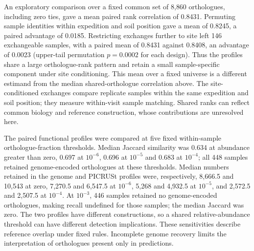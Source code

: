 \documentclass[11pt]{article}
\begin{document}
An exploratory comparison over a fixed common set of 8{,}860 orthologues, including zero ties, gave a mean paired rank correlation of 0.8431. Permuting sample identities within expedition and soil position gave a mean of 0.8245, a paired advantage of 0.0185. Restricting exchanges further to site left 146 exchangeable samples, with a paired mean of 0.8431 against 0.8408, an advantage of 0.0023 (upper-tail permutation $p = 0.0002$ for each design). Thus the profiles share a large orthologue-rank pattern and retain a small sample-specific component under site conditioning. This mean over a fixed universe is a different estimand from the median shared-orthologue correlation above. The site-conditioned exchanges compare replicate samples within the same expedition and soil position; they measure within-visit sample matching. Shared ranks can reflect common biology and reference construction, whose contributions are unresolved here.

The paired functional profiles were compared at five fixed within-sample orthologue-fraction thresholds. Median Jaccard similarity was 0.634 at abundance greater than zero, 0.697 at $10^{-6}$, 0.696 at $10^{-5}$ and 0.683 at $10^{-4}$; all 448 samples retained genome-encoded orthologues at these thresholds. Median numbers retained in the genome and PICRUSt profiles were, respectively, 8{,}666.5 and 10{,}543 at zero, 7{,}270.5 and 6{,}547.5 at $10^{-6}$, 5{,}268 and 4{,}932.5 at $10^{-5}$, and 2{,}572.5 and 2{,}507.5 at $10^{-4}$. At $10^{-3}$, 446 samples retained no genome-encoded orthologues, making recall undefined for those samples; the median Jaccard was zero. The two profiles have different constructions, so a shared relative-abundance threshold can have different detection implications. These sensitivities describe reference overlap under fixed rules. Incomplete genome recovery limits the interpretation of orthologues present only in predictions.
\end{document}
